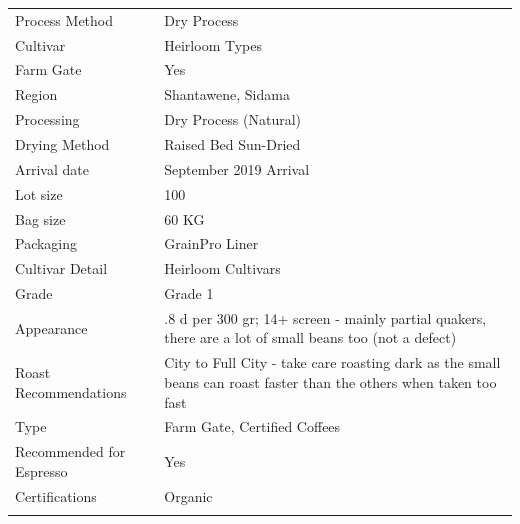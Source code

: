 \documentclass[10pt,twoside,footinclude=true,headinclude=true]{scrbook} %
\newlength{\mysize}
\newcommand{\myfontsize}[1]{
  \setlength{\mysize}{#1pt}
  \fontsize{\mysize}{1.2\mysize}
  \selectfont
}
\begin{document}
\vspace{1mm}
\begin{table}[htbp]
\myfontsize{7}
\hspace*{2.2em}
\begin{tabular}{ >{\raggedleft\arraybackslash}p{3.6cm}!{\color{lightgray}\vrule}p{7cm} }
\hline
  Process Method & Dry Process \\
  \hline
  Cultivar & Heirloom Types \\
  \hline
  Farm Gate & Yes \\
  \hline
  Region & Shantawene, Sidama \\
  \hline
  Processing & Dry Process (Natural) \\
  \hline
  Drying Method & Raised Bed Sun-Dried \\
  \hline
  Arrival date & September 2019 Arrival \\
  \hline
  Lot size & 100 \\
  \hline
  Bag size & 60 KG \\
  \hline
  Packaging & GrainPro Liner \\
  \hline
  Cultivar Detail & Heirloom Cultivars \\
  \hline
  Grade & Grade 1 \\
  \hline
  Appearance & .8 d per 300 gr; 14+ screen - mainly partial quakers, there are a lot of small beans too (not a defect) \\
  \hline
  Roast Recommendations & City to Full City - take care roasting dark as the small beans can roast faster than the others when taken too fast \\
  \hline
  Type & Farm Gate, Certified Coffees \\
  \hline
  Recommended for Espresso & Yes \\
  \hline
  Certifications & Organic \\
  \hline

\end{tabular}
\end{table}

\end{document}
